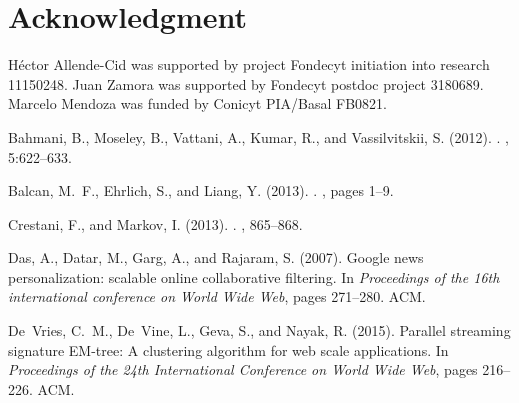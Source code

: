 \documentclass[preprint,12pt,authoryear,review]{elsarticle}
\begin{document}
\section{Acknowledgment}
H\'ector Allende-Cid was supported by project Fondecyt initiation into research 11150248.
Juan Zamora was supported by Fondecyt postdoc project 3180689.
Marcelo Mendoza was funded by Conicyt PIA/Basal FB0821.
\clearpage 



\begin{thebibliography}{00}




Bahmani, B., Moseley, B., Vattani, A., Kumar, R., and Vassilvitskii, S. (2012).
.
, 5:622--633.

Balcan, M.~F., Ehrlich, S., and Liang, Y. (2013).
.
, pages 1--9.

Crestani, F., and Markov, I. (2013).
.
, 865--868.

Das, A., Datar, M., Garg, A., and Rajaram, S. (2007).
\newblock Google news personalization: scalable online collaborative filtering.
\newblock In {\em Proceedings of the 16th international conference on World
  Wide Web}, pages 271--280. ACM.

De~Vries, C.~M., De~Vine, L., Geva, S., and Nayak, R. (2015).
\newblock Parallel streaming signature {EM}-tree: A clustering algorithm for web
  scale applications.
\newblock In {\em Proceedings of the 24th International Conference on World
  Wide Web}, pages 216--226. ACM.


\end{thebibliography}
\end{document}
